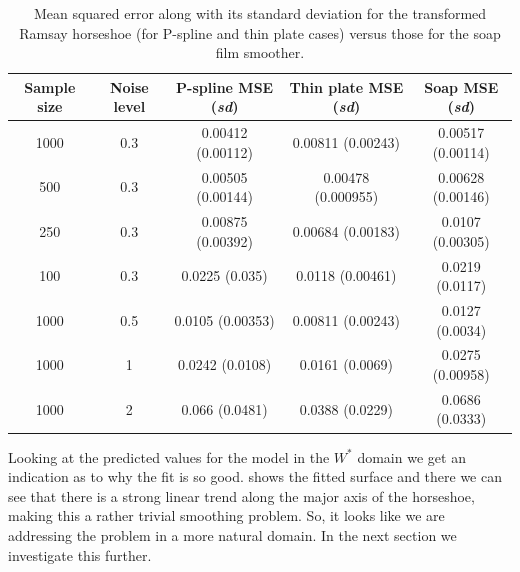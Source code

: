 \begin{table}[ht]
\begin{tabular}{c c c c c}\\
Sample size & Noise level & P-spline MSE (\emph{sd}) & Thin plate MSE (\emph{sd}) & Soap MSE (\emph{sd}) \\
\hline
\hline
1000 & 0.3 & 0.00412 (0.00112) & 0.00811 (0.00243) & 0.00517 (0.00114) \\ 
500 & 0.3 & 0.00505 (0.00144) & 0.00478 (0.000955) & 0.00628 (0.00146) \\ 
250 & 0.3 & 0.00875 (0.00392) & 0.00684 (0.00183) & 0.0107 (0.00305) \\ 
100 & 0.3 & 0.0225 (0.035) & 0.0118 (0.00461) & 0.0219 (0.0117) \\ 
1000 & 0.5 & 0.0105 (0.00353) & 0.00811 (0.00243) & 0.0127 (0.0034) \\ 
1000 & 1 & 0.0242 (0.0108) & 0.0161 (0.0069) & 0.0275 (0.00958) \\ 
1000 & 2 & 0.066 (0.0481) & 0.0388 (0.0229) & 0.0686 (0.0333) \\ 
\end{tabular}
\label{scramsayres}
\caption{Mean squared error along with its standard deviation for the transformed Ramsay horseshoe (for P-spline and thin plate cases) versus those for the soap film smoother.}
\end{table}






















Looking at the predicted values for the model in the $W^*$ domain we get an indication as to why the fit is so good.  shows the fitted surface and there we can see that there is a strong linear trend along the major axis of the horseshoe, making this a rather trivial smoothing problem. So, it looks like we are addressing the problem in a more natural domain. In the next section we investigate this further.

